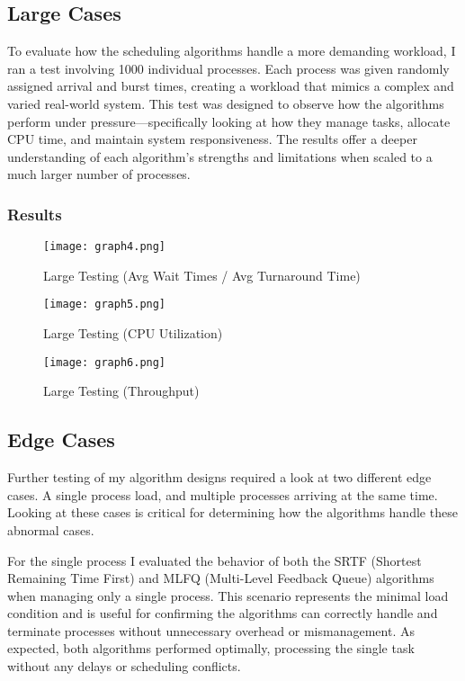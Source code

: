 \documentclass[11pt]{article}
\begin{document}
\subsection{Large Cases}
To evaluate how the scheduling algorithms handle a more demanding workload, I ran a test involving 1000 individual processes. Each process was given randomly assigned arrival and burst times, creating a workload that mimics a complex and varied real-world system. This test was designed to observe how the algorithms perform under pressure—specifically looking at how they manage tasks, allocate CPU time, and maintain system responsiveness. The results offer a deeper understanding of each algorithm’s strengths and limitations when scaled to a much larger number of processes.
\subsubsection{Results}

\begin{figure} [H]
    \centering
    \texttt{[image: graph4.png]}
    \caption{Large Testing (Avg Wait Times / Avg Turnaround Time)}
    \label{fig:enter-label}
\end{figure}

\begin{figure}[H]
    \centering
    \texttt{[image: graph5.png]}
    \caption{Large Testing (CPU Utilization)}
    \label{fig:enter-label}
\end{figure}

\begin{figure} [H]
    \centering
    \texttt{[image: graph6.png]}
    \caption{Large Testing (Throughput)}
    \label{fig:enter-label}
\end{figure}
\subsection{Edge Cases}

Further testing of my algorithm designs required a look at two different edge cases. A single process load, and multiple processes arriving at the same time. Looking at these cases is critical for determining how the algorithms handle these abnormal cases.

For the single process I evaluated the behavior of both the SRTF (Shortest Remaining Time First) and MLFQ (Multi-Level Feedback Queue) algorithms when managing only a single process. This scenario represents the minimal load condition and is useful for confirming the algorithms can correctly handle and terminate processes without unnecessary overhead or mismanagement. As expected, both algorithms performed optimally, processing the single task without any delays or scheduling conflicts.
\end{document}
